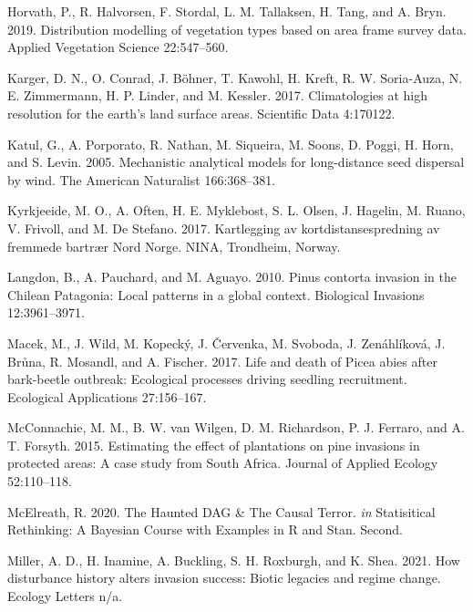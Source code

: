 \documentclass[
]{article}
\begin{document}
\leavevmode\hypertarget{ref-horvathDistributionModellingVegetation2019}{}%
Horvath, P., R. Halvorsen, F. Stordal, L. M. Tallaksen, H. Tang, and A. Bryn. 2019. Distribution modelling of vegetation types based on area frame survey data. Applied Vegetation Science 22:547--560.

\leavevmode\hypertarget{ref-kargerClimatologiesHighResolution2017}{}%
Karger, D. N., O. Conrad, J. Böhner, T. Kawohl, H. Kreft, R. W. Soria-Auza, N. E. Zimmermann, H. P. Linder, and M. Kessler. 2017. Climatologies at high resolution for the earth's land surface areas. Scientific Data 4:170122.

\leavevmode\hypertarget{ref-katulMechanisticAnalyticalModels2005}{}%
Katul, G., A. Porporato, R. Nathan, M. Siqueira, M. Soons, D. Poggi, H. Horn, and S. Levin. 2005. Mechanistic analytical models for long-distance seed dispersal by wind. The American Naturalist 166:368--381.

\leavevmode\hypertarget{ref-kyrkjeeideKartleggingAvKortdistansespredning2017}{}%
Kyrkjeeide, M. O., A. Often, H. E. Myklebost, S. L. Olsen, J. Hagelin, M. Ruano, V. Frivoll, and M. De Stefano. 2017. Kartlegging av kortdistansespredning av fremmede bartrær Nord Norge. NINA, Trondheim, Norway.

\leavevmode\hypertarget{ref-langdonPinusContortaInvasion2010}{}%
Langdon, B., A. Pauchard, and M. Aguayo. 2010. Pinus contorta invasion in the Chilean Patagonia: Local patterns in a global context. Biological Invasions 12:3961--3971.

\leavevmode\hypertarget{ref-macekLifeDeathPicea2017}{}%
Macek, M., J. Wild, M. Kopecký, J. Červenka, M. Svoboda, J. Zenáhlíková, J. Brůna, R. Mosandl, and A. Fischer. 2017. Life and death of Picea abies after bark-beetle outbreak: Ecological processes driving seedling recruitment. Ecological Applications 27:156--167.

\leavevmode\hypertarget{ref-mcconnachieEstimatingEffectPlantations2015}{}%
McConnachie, M. M., B. W. van Wilgen, D. M. Richardson, P. J. Ferraro, and A. T. Forsyth. 2015. Estimating the effect of plantations on pine invasions in protected areas: A case study from South Africa. Journal of Applied Ecology 52:110--118.

\leavevmode\hypertarget{ref-mcelreathHauntedDAGCausal2020}{}%
McElreath, R. 2020. The Haunted DAG \& The Causal Terror. \emph{in} Statisitical Rethinking: A Bayesian Course with Examples in R and Stan. Second.

\leavevmode\hypertarget{ref-millerHowDisturbanceHistory2021}{}%
Miller, A. D., H. Inamine, A. Buckling, S. H. Roxburgh, and K. Shea. 2021. How disturbance history alters invasion success: Biotic legacies and regime change. Ecology Letters n/a.
\end{document}
